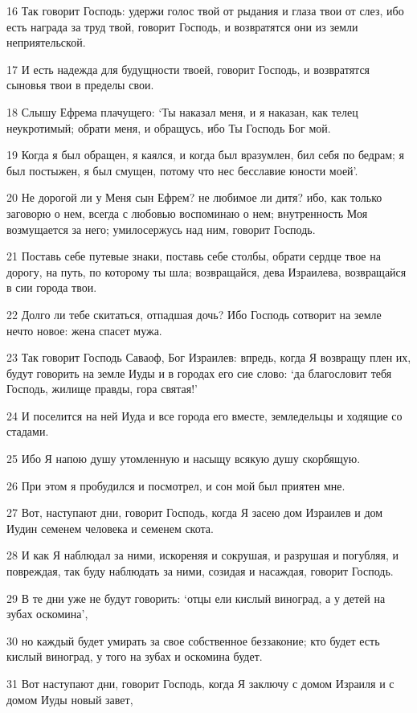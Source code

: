 \par 16 Так говорит Господь: удержи голос твой от рыдания и глаза твои от слез, ибо есть награда за труд твой, говорит Господь, и возвратятся они из земли неприятельской.
\par 17 И есть надежда для будущности твоей, говорит Господь, и возвратятся сыновья твои в пределы свои.
\par 18 Слышу Ефрема плачущего: `Ты наказал меня, и я наказан, как телец неукротимый; обрати меня, и обращусь, ибо Ты Господь Бог мой.
\par 19 Когда я был обращен, я каялся, и когда был вразумлен, бил себя по бедрам; я был постыжен, я был смущен, потому что нес бесславие юности моей'.
\par 20 Не дорогой ли у Меня сын Ефрем? не любимое ли дитя? ибо, как только заговорю о нем, всегда с любовью воспоминаю о нем; внутренность Моя возмущается за него; умилосержусь над ним, говорит Господь.
\par 21 Поставь себе путевые знаки, поставь себе столбы, обрати сердце твое на дорогу, на путь, по которому ты шла; возвращайся, дева Израилева, возвращайся в сии города твои.
\par 22 Долго ли тебе скитаться, отпадшая дочь? Ибо Господь сотворит на земле нечто новое: жена спасет мужа.
\par 23 Так говорит Господь Саваоф, Бог Израилев: впредь, когда Я возвращу плен их, будут говорить на земле Иуды и в городах его сие слово: `да благословит тебя Господь, жилище правды, гора святая!'
\par 24 И поселится на ней Иуда и все города его вместе, земледельцы и ходящие со стадами.
\par 25 Ибо Я напою душу утомленную и насыщу всякую душу скорбящую.
\par 26 При этом я пробудился и посмотрел, и сон мой был приятен мне.
\par 27 Вот, наступают дни, говорит Господь, когда Я засею дом Израилев и дом Иудин семенем человека и семенем скота.
\par 28 И как Я наблюдал за ними, искореняя и сокрушая, и разрушая и погубляя, и повреждая, так буду наблюдать за ними, созидая и насаждая, говорит Господь.
\par 29 В те дни уже не будут говорить: `отцы ели кислый виноград, а у детей на зубах оскомина',
\par 30 но каждый будет умирать за свое собственное беззаконие; кто будет есть кислый виноград, у того на зубах и оскомина будет.
\par 31 Вот наступают дни, говорит Господь, когда Я заключу с домом Израиля и с домом Иуды новый завет,
